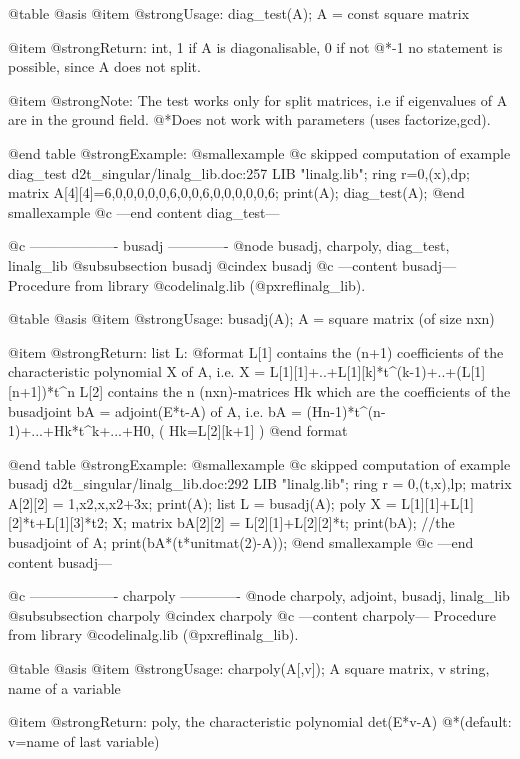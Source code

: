 @table @asis
@item @strong{Usage:}
diag_test(A); A = const square matrix

@item @strong{Return:}
int, 1 if A is diagonalisable, 0 if not
@*-1 no statement is possible, since A does not split.

@item @strong{Note:}
The test works only for split matrices, i.e if eigenvalues of A
are in the ground field.
@*Does not work with parameters (uses factorize,gcd).

@end table
@strong{Example:}
@smallexample
@c skipped computation of example diag_test d2t_singular/linalg_lib.doc:257 
LIB "linalg.lib";
ring r=0,(x),dp;
matrix A[4][4]=6,0,0,0,0,0,6,0,0,6,0,0,0,0,0,6;
print(A);
diag_test(A);
@end smallexample
@c ---end content diag_test---

@c ------------------- busadj -------------
@node busadj, charpoly, diag_test, linalg_lib
@subsubsection busadj
@cindex busadj
@c ---content busadj---
Procedure from library @code{linalg.lib} (@pxref{linalg_lib}).

@table @asis
@item @strong{Usage:}
busadj(A); A = square matrix (of size nxn)

@item @strong{Return:}
list L:
@format
         L[1] contains the (n+1) coefficients of the characteristic
              polynomial X of A, i.e.
              X = L[1][1]+..+L[1][k]*t^(k-1)+..+(L[1][n+1])*t^n
         L[2] contains the n (nxn)-matrices Hk which are the coefficients of
              the busadjoint bA = adjoint(E*t-A) of A, i.e.
              bA = (Hn-1)*t^(n-1)+...+Hk*t^k+...+H0,  ( Hk=L[2][k+1] )
@end format

@end table
@strong{Example:}
@smallexample
@c skipped computation of example busadj d2t_singular/linalg_lib.doc:292 
LIB "linalg.lib";
ring r = 0,(t,x),lp;
matrix A[2][2] = 1,x2,x,x2+3x;
print(A);
list L = busadj(A);
poly X = L[1][1]+L[1][2]*t+L[1][3]*t2; X;
matrix bA[2][2] = L[2][1]+L[2][2]*t;
print(bA);               //the busadjoint of A;
print(bA*(t*unitmat(2)-A));
@end smallexample
@c ---end content busadj---

@c ------------------- charpoly -------------
@node charpoly, adjoint, busadj, linalg_lib
@subsubsection charpoly
@cindex charpoly
@c ---content charpoly---
Procedure from library @code{linalg.lib} (@pxref{linalg_lib}).

@table @asis
@item @strong{Usage:}
charpoly(A[,v]); A square matrix, v string, name of a variable

@item @strong{Return:}
poly, the characteristic polynomial det(E*v-A)
@*(default: v=name of last variable)

